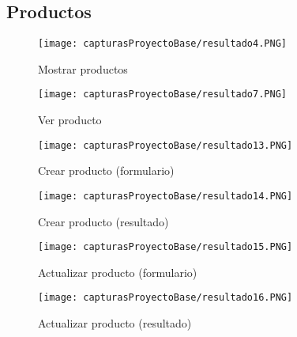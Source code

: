 \documentclass[titlepage, 12pt]{article}
\begin{document}
    \clearpage
    \subsection{Productos}
    
    \begin{figure}[h]
        \caption{Mostrar productos}
        \centering
        \texttt{[image: capturasProyectoBase/resultado4.PNG]} \par\vspace{0.5cm}
    \end{figure}
        
    \begin{figure}[h]
        \caption{Ver producto}
        \centering
        \texttt{[image: capturasProyectoBase/resultado7.PNG]} \par\vspace{0.5cm}
    \end{figure}
    
    \clearpage
    
    \begin{figure}[h]
        \caption{Crear producto (formulario)}
        \centering
        \texttt{[image: capturasProyectoBase/resultado13.PNG]} \par\vspace{0.5cm}
    \end{figure}
    
    \begin{figure}[h]
        \caption{Crear producto (resultado)}
        \centering
        \texttt{[image: capturasProyectoBase/resultado14.PNG]} \par\vspace{0.5cm}
    \end{figure}
    
    \clearpage
    
    \begin{figure}[h]
        \caption{Actualizar producto (formulario)}
        \centering
        \texttt{[image: capturasProyectoBase/resultado15.PNG]} \par\vspace{0.5cm}
    \end{figure}
    
    \begin{figure}[h]
        \caption{Actualizar producto (resultado)}
        \centering
        \texttt{[image: capturasProyectoBase/resultado16.PNG]} \par\vspace{0.5cm}
    \end{figure}
    
\end{document}
